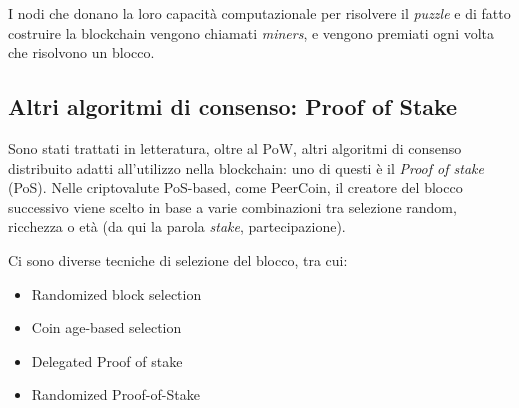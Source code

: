 I nodi che donano la loro capacità computazionale per risolvere il \textit{puzzle} e di fatto costruire la blockchain vengono chiamati \textit{miners}, e vengono premiati ogni volta che risolvono un blocco.

\subsection{Altri algoritmi di consenso: Proof of Stake}
\label{c:tec:bitcoin:pow}

Sono stati trattati in letteratura, oltre al PoW, altri algoritmi di consenso distribuito adatti all'utilizzo nella blockchain: uno di questi è il \textit{Proof of stake} (PoS)\cite{}. Nelle criptovalute PoS-based, come PeerCoin, il creatore del blocco successivo viene scelto in base a varie combinazioni tra selezione random, ricchezza o età (da qui la parola \textit{stake}, partecipazione).

Ci sono diverse tecniche di selezione del blocco, tra cui:

\begin{itemize}
    \item Randomized block selection
    \item Coin age-based selection
    \item Delegated Proof of stake
    \item Randomized Proof-of-Stake
\end{itemize}






